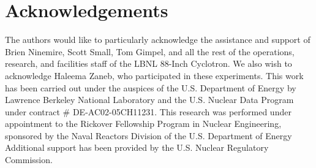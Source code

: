 \documentclass[%
 reprint,
superscriptaddress,
onecolumn,
notitlepage,
 amsmath,amssymb,
 aps,
prc,
]{revtex4-1}
\begin{document}
\date{\today}%

\begin{abstract}


% 
% 




\end{abstract}

\maketitle









 \section{Acknowledgements}
 
 
The authors would like to particularly acknowledge the assistance and support of  Brien Ninemire, Scott Small, Tom Gimpel, and all the rest of the operations, research, and facilities staff of the LBNL 88-Inch Cyclotron.
We also wish to acknowledge Haleema Zaneb, who participated in these experiments.
This work has been carried out  under the auspices of the U.S. Department of Energy by  Lawrence Berkeley National Laboratory and the U.S. Nuclear Data Program under contract \# DE-AC02-05CH11231.
This research was performed under appointment to the Rickover Fellowship Program in Nuclear Engineering, sponsored by the Naval Reactors Division of the U.S. Department of Energy
Additional support has been provided by the U.S. Nuclear Regulatory Commission.
\end{document}
